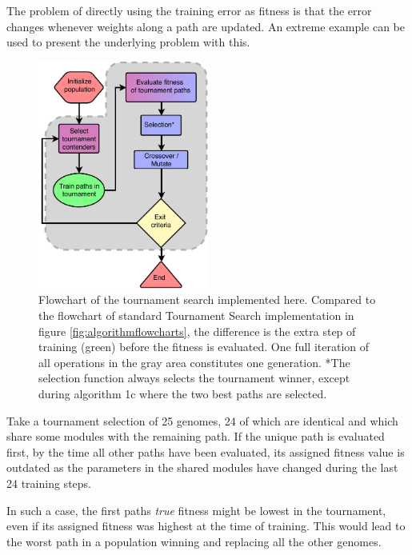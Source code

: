 The problem of directly using the training error as fitness is that the error changes whenever weights along a path are updated. An extreme example can be used to present the underlying problem with this.

\begin{figure}[ht]
    \centering
    \includegraphics[width=0.5\textwidth]{Chapters/4.Experiments/exp2/figures/TS_implementation.pdf}
    \caption[Tournament search flowchart]{Flowchart of the tournament search implemented here. Compared to the flowchart of standard Tournament Search implementation in figure \ref{fig:algorithmflowcharts}, the difference is the extra step of training (green) before the fitness is evaluated. One full iteration of all operations in the gray area constitutes one generation. *The selection function always selects the tournament winner, except during algorithm 1c where the two best paths are selected.}
    \label{fig:ts_flowchart}
\end{figure}

Take a tournament selection of 25 genomes, 24 of which are identical and which share some modules with the remaining path. If the unique path is evaluated first, by the time all other paths have been evaluated, its assigned fitness value is outdated as the parameters in the shared modules have changed during the last 24 training steps.

In such a case, the first paths \emph{true} fitness might be lowest in the tournament, even if its assigned fitness was highest at the time of training. This would lead to the worst path in a population winning and replacing all the other genomes. 

